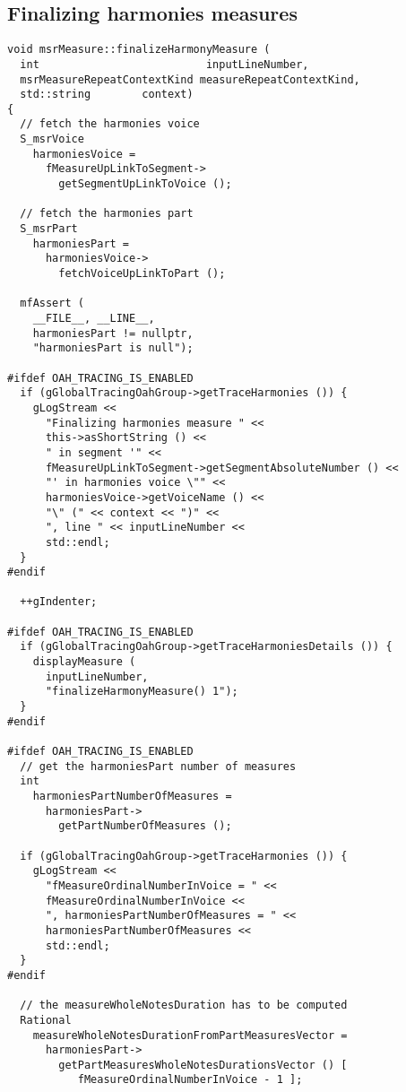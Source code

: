 \subsection{Finalizing harmonies measures}

\begin{lstlisting}[language=CPlusPlus]
void msrMeasure::finalizeHarmonyMeasure (
  int                          inputLineNumber,
  msrMeasureRepeatContextKind measureRepeatContextKind,
  std::string        context)
{
  // fetch the harmonies voice
  S_msrVoice
    harmoniesVoice =
      fMeasureUpLinkToSegment->
        getSegmentUpLinkToVoice ();

  // fetch the harmonies part
  S_msrPart
    harmoniesPart =
      harmoniesVoice->
        fetchVoiceUpLinkToPart ();

  mfAssert (
    __FILE__, __LINE__,
    harmoniesPart != nullptr,
    "harmoniesPart is null");

#ifdef OAH_TRACING_IS_ENABLED
  if (gGlobalTracingOahGroup->getTraceHarmonies ()) {
    gLogStream <<
      "Finalizing harmonies measure " <<
      this->asShortString () <<
      " in segment '" <<
      fMeasureUpLinkToSegment->getSegmentAbsoluteNumber () <<
      "' in harmonies voice \"" <<
      harmoniesVoice->getVoiceName () <<
      "\" (" << context << ")" <<
      ", line " << inputLineNumber <<
      std::endl;
  }
#endif

  ++gIndenter;

#ifdef OAH_TRACING_IS_ENABLED
  if (gGlobalTracingOahGroup->getTraceHarmoniesDetails ()) {
    displayMeasure (
      inputLineNumber,
      "finalizeHarmonyMeasure() 1");
  }
#endif

#ifdef OAH_TRACING_IS_ENABLED
  // get the harmoniesPart number of measures
  int
    harmoniesPartNumberOfMeasures =
      harmoniesPart->
        getPartNumberOfMeasures ();

  if (gGlobalTracingOahGroup->getTraceHarmonies ()) {
    gLogStream <<
      "fMeasureOrdinalNumberInVoice = " <<
      fMeasureOrdinalNumberInVoice <<
      ", harmoniesPartNumberOfMeasures = " <<
      harmoniesPartNumberOfMeasures <<
      std::endl;
  }
#endif

  // the measureWholeNotesDuration has to be computed
  Rational
    measureWholeNotesDurationFromPartMeasuresVector =
      harmoniesPart->
        getPartMeasuresWholeNotesDurationsVector () [
           fMeasureOrdinalNumberInVoice - 1 ];


\end{lstlisting}
